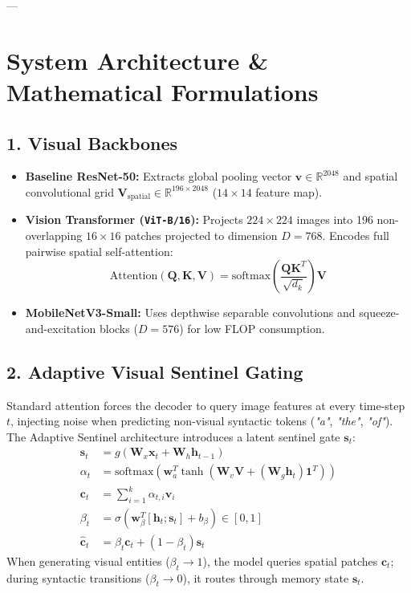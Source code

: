 \documentclass[11pt,a4paper]{article}
\begin{document}
---

\section{System Architecture \& Mathematical Formulations}

\subsection{1. Visual Backbones}
\begin{itemize}[leftmargin=*]
    \item \textbf{Baseline ResNet-50:} Extracts global pooling vector $\mathbf{v} \in \mathbb{R}^{2048}$ and spatial convolutional grid $\mathbf{V}_{\text{spatial}} \in \mathbb{R}^{196 \times 2048}$ ($14 \times 14$ feature map).
    \item \textbf{Vision Transformer (\texttt{ViT-B/16}):} Projects $224 \times 224$ images into 196 non-overlapping $16 \times 16$ patches projected to dimension $D = 768$. Encodes full pairwise spatial self-attention:
    \begin{equation}
        \text{Attention}(\mathbf{Q}, \mathbf{K}, \mathbf{V}) = \text{softmax}\left(\frac{\mathbf{Q}\mathbf{K}^T}{\sqrt{d_k}}\right)\mathbf{V}
    \end{equation}
    \item \textbf{MobileNetV3-Small:} Uses depthwise separable convolutions and squeeze-and-excitation blocks ($D = 576$) for low FLOP consumption.
\end{itemize}

\subsection{2. Adaptive Visual Sentinel Gating}
Standard attention forces the decoder to query image features at every time-step $t$, injecting noise when predicting non-visual syntactic tokens (\textit{"a"}, \textit{"the"}, \textit{"of"}). The Adaptive Sentinel architecture introduces a latent sentinel gate $\mathbf{s}_t$:
\begin{align}
    \mathbf{s}_t &= g\left(\mathbf{W}_x \mathbf{x}_t + \mathbf{W}_h \mathbf{h}_{t-1}\right) \\
    \alpha_t &= \text{softmax}\left(\mathbf{w}_a^T \tanh\left(\mathbf{W}_v \mathbf{V} + (\mathbf{W}_g \mathbf{h}_t)\mathbf{1}^T\right)\right) \\
    \mathbf{c}_t &= \sum_{i=1}^{k} \alpha_{t,i} \mathbf{v}_i \\
    \beta_t &= \sigma\left(\mathbf{w}_\beta^T [\mathbf{h}_t; \mathbf{s}_t] + b_\beta\right) \in [0, 1] \\
    \hat{\mathbf{c}}_t &= \beta_t \mathbf{c}_t + (1 - \beta_t) \mathbf{s}_t
\end{align}
When generating visual entities ($\beta_t \to 1$), the model queries spatial patches $\mathbf{c}_t$; during syntactic transitions ($\beta_t \to 0$), it routes through memory state $\mathbf{s}_t$.
\end{document}
